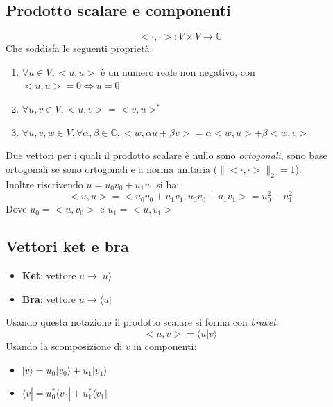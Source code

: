 \documentclass[12pt, a4paper]{report}
\begin{document}
\subsection{Prodotto scalare e componenti}
\begin{equation*}
    < \cdot, \cdot > : V \times V \rightarrow \mathbb{C}
\end{equation*}
Che soddisfa le seguenti proprietà:
\begin{enumerate}
    \item $\forall u\in V, <u,u>$ è un numero reale non negativo, con $<u,u>=0 \iff u=0$
    \item $\forall u,v \in V, <u,v>=<v,u>^{*}$
    \item $\forall u,v,w \in V,\forall \alpha,\beta \in \mathbb{C}, <w,\alpha u+\beta v>=\alpha<w,u>+\beta<w,v>$
\end{enumerate}
Due vettori per i quali il prodotto scalare è nullo sono \textit{ortogonali}, sono base ortogonali se sono ortogonali e a norma unitaria ($\lVert <\cdot,\cdot>\rVert_{2}=1$).\\
Inoltre riscrivendo $u=u_{0}v_{0}+u_{1}v_{1}$ si ha:
\begin{equation*}
    <u,u>=<u_{0}v_{0}+u_{1}v_{1},u_{0}v_{0}+u_{1}v_{1}>=u_{0}^{2}+u_{1}^{2}
\end{equation*}
Dove $u_{0}=<u,v_{0}>$ e $u_{1}=<u,v_{1}>$
\subsection{Vettori ket e bra}
\begin{itemize}
    \item \textbf{Ket}: vettore $u \rightarrow |u\rangle$
    \item \textbf{Bra}: vettore $u \rightarrow \langle u|$
\end{itemize}
Usando questa notazione il prodotto scalare si forma con \textit{braket}:
\begin{equation*}
    <u,v>=\langle u|v\rangle
\end{equation*}
Usando la scomposizione di $v$ in componenti:
\begin{itemize}
    \item $|v\rangle = u_{0}|v_{0}\rangle + u_{1}|v_{1}\rangle$
    \item $\langle v| = u_{0}^{*}\langle v_{0}| + u_{1}^{*}\langle v_{1}|$
\end{itemize}
\end{document}
